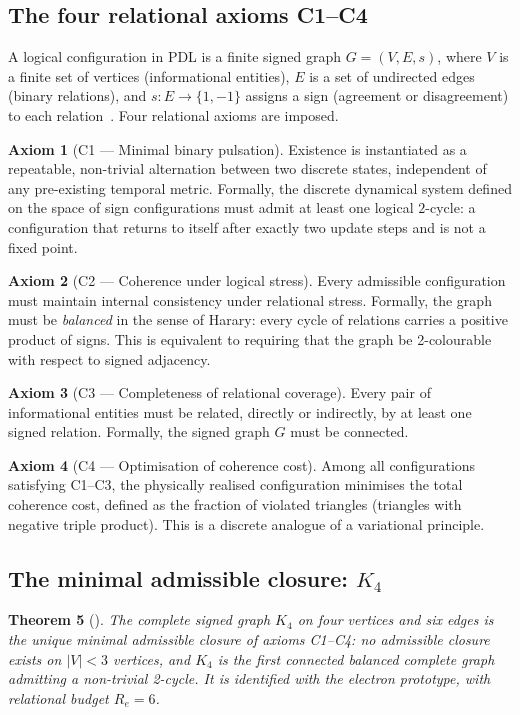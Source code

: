 \documentclass[11pt,a4paper]{article}
\theoremstyle{plain}
\newtheorem{theorem}{Theorem}[section]
\theoremstyle{definition}
\newtheorem{axiom}[theorem]{Axiom}
\theoremstyle{remark}
\begin{document}
\subsection{The four relational axioms C1--C4}
\label{subsec:axioms}
A logical configuration in PDL is a finite signed graph $G=(V,E,s)$, where $V$ is a finite set of vertices (informational entities), $E$ is a set of undirected edges (binary relations), and $s\colon E\to\{1,-1\}$ assigns a sign (agreement or disagreement) to each relation~\cite{D01,D02}. Four relational axioms are imposed.

\begin{axiom}[C1 --- Minimal binary pulsation]
Existence is instantiated as a repeatable, non-trivial alternation between two discrete states, independent of any pre-existing temporal metric. Formally, the discrete dynamical system defined on the space of sign configurations must admit at least one logical $2$-cycle: a configuration that returns to itself after exactly two update steps and is not a fixed point.
\end{axiom}

\begin{axiom}[C2 --- Coherence under logical stress]
Every admissible configuration must maintain internal consistency under relational stress. Formally, the graph must be \emph{balanced} in the sense of Harary: every cycle of relations carries a positive product of signs. This is equivalent to requiring that the graph be 2-colourable with respect to signed adjacency.
\end{axiom}

\begin{axiom}[C3 --- Completeness of relational coverage]
Every pair of informational entities must be related, directly or indirectly, by at least one signed relation. Formally, the signed graph $G$ must be connected.
\end{axiom}

\begin{axiom}[C4 --- Optimisation of coherence cost]
Among all configurations satisfying C1--C3, the physically realised configuration minimises the total coherence cost, defined as the fraction of violated triangles (triangles with negative triple product). This is a discrete analogue of a variational principle.
\end{axiom}

\subsection{The minimal admissible closure: \texorpdfstring{$K_4$}{K4}}
\label{subsec:K4}
\begin{theorem}[\cite{D16a}]
\label{thm:K4}
The complete signed graph $K_4$ on four vertices and six edges is the unique minimal admissible closure of axioms C1--C4: no admissible closure exists on $|V|<3$ vertices, and $K_4$ is the first connected balanced complete graph admitting a non-trivial 2-cycle. It is identified with the electron prototype, with relational budget $R_e=6$.
\end{theorem}
\end{document}
